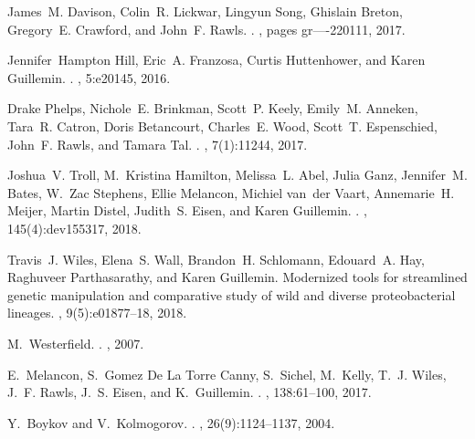 \begin{thebibliography}{10}
	James~M. Davison, Colin~R. Lickwar, Lingyun Song, Ghislain Breton, Gregory~E.
	Crawford, and John~F. Rawls.
	.
	, pages gr----220111, 2017.
	
	Jennifer~Hampton Hill, Eric~A. Franzosa, Curtis Huttenhower, and Karen
	Guillemin.
	.
	, 5:e20145, 2016.
	
	Drake Phelps, Nichole~E. Brinkman, Scott~P. Keely, Emily~M. Anneken, Tara~R.
	Catron, Doris Betancourt, Charles~E. Wood, Scott~T. Espenschied, John~F.
	Rawls, and Tamara Tal.
	.
	, 7(1):11244, 2017.
	
	Joshua~V. Troll, M.~Kristina Hamilton, Melissa~L. Abel, Julia Ganz, Jennifer~M.
	Bates, W.~Zac Stephens, Ellie Melancon, Michiel van~der Vaart, Annemarie~H.
	Meijer, Martin Distel, Judith~S. Eisen, and Karen Guillemin.
	.
	, 145(4):dev155317, 2018.
	
	Travis~J. Wiles, Elena~S. Wall, Brandon~H. Schlomann, Edouard~A. Hay, Raghuveer
	Parthasarathy, and Karen Guillemin.
	\newblock Modernized tools for streamlined genetic manipulation and comparative
	study of wild and diverse proteobacterial lineages.
	, 9(5):e01877--18, 2018.
	
	M.~Westerfield.
	.
	, 2007.
	
	E.~Melancon, S.~{Gomez De La Torre Canny}, S.~Sichel, M.~Kelly, T.~J. Wiles,
	J.~F. Rawls, J.~S. Eisen, and K.~Guillemin.
	.
	, 138:61--100, 2017.
	
	Y.~Boykov and V.~Kolmogorov.
	.
	,
	26(9):1124--1137, 2004.
	

\end{thebibliography}

